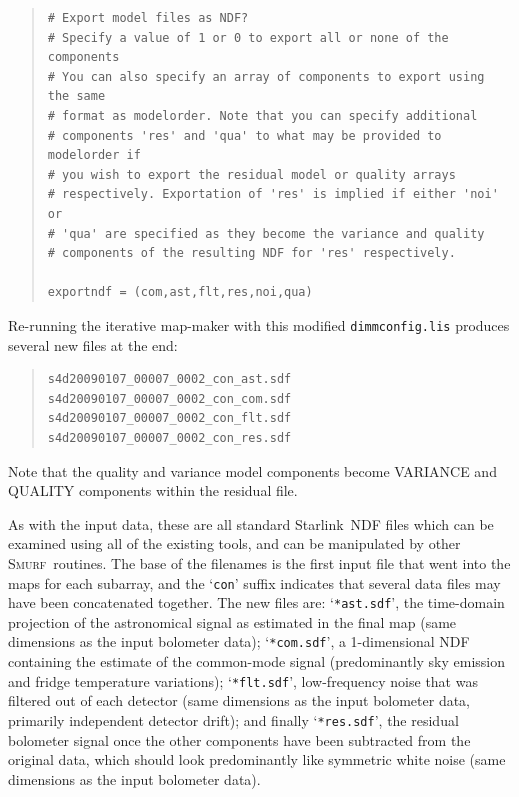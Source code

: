\documentclass[twoside,11pt]{article}
\newenvironment{myquote}{\begin{quote}\begin{small}}{\end{small}\end{quote}}
\newcommand{\starlink}{\htmladdnormallink{Starlink}{http://starlink.jach.hawaii.edu}}
\newcommand{\smurf}{\xref{\textsc{Smurf}}{sun258}{}}
\newcommand{\htmladdnormallink}[2]{#1}
\newcommand{\xref}[3]{#1}
\renewcommand{\_}{\texttt{\symbol{95}}}
\begin{document}
\begin{myquote}
\begin{verbatim}
# Export model files as NDF?
# Specify a value of 1 or 0 to export all or none of the components
# You can also specify an array of components to export using the same
# format as modelorder. Note that you can specify additional
# components 'res' and 'qua' to what may be provided to modelorder if
# you wish to export the residual model or quality arrays
# respectively. Exportation of 'res' is implied if either 'noi' or
# 'qua' are specified as they become the variance and quality
# components of the resulting NDF for 'res' respectively.

exportndf = (com,ast,flt,res,noi,qua)
\end{verbatim}
\end{myquote}

Re-running the iterative map-maker with this modified
\texttt{dimmconfig.lis} produces several new files at the end:

\begin{myquote}
\begin{verbatim}
s4d20090107_00007_0002_con_ast.sdf
s4d20090107_00007_0002_con_com.sdf
s4d20090107_00007_0002_con_flt.sdf
s4d20090107_00007_0002_con_res.sdf
\end{verbatim}
\end{myquote}

Note that the quality and variance model components become VARIANCE
and QUALITY components within the residual file.

As with the input data, these are all standard \starlink\ NDF files
which can be examined using all of the existing tools, and can be
manipulated by other \smurf\ routines. The base of the filenames is
the first input file that went into the maps for each subarray, and
the `\texttt{con}' suffix indicates that several data files may have
been concatenated together. The new files are: `\texttt{*ast.sdf}',
the time-domain projection of the astronomical signal as estimated in
the final map (same dimensions as the input bolometer data);
`\texttt{*com.sdf}', a 1-dimensional NDF containing the estimate of
the common-mode signal (predominantly sky emission and fridge
temperature variations); `\texttt{*flt.sdf}', low-frequency noise that
was filtered out of each detector (same dimensions as the input
bolometer data, primarily independent detector drift); and finally
`\texttt{*res.sdf}', the residual bolometer signal once the other
components have been subtracted from the original data, which should
look predominantly like symmetric white noise (same dimensions as the
input bolometer data).
\end{document}
